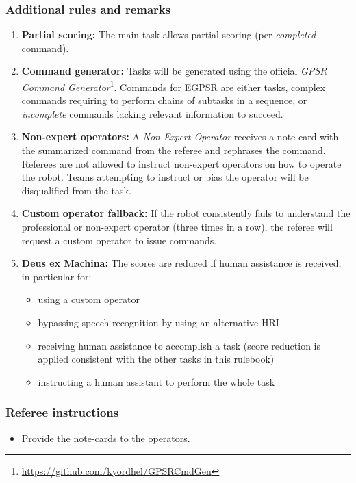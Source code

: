 \subsubsection*{Additional rules and remarks}
\begin{enumerate}[nosep]
	\item \textbf{Partial scoring:} The main task allows partial scoring (per \emph{completed} command).

	\item \textbf{Command generator:} Tasks will be generated using the official \emph{GPSR Command Generator}\footnote{\url{https://github.com/kyordhel/GPSRCmdGen}}.
	Commands for EGPSR are either \STWO{} tasks, complex commands requiring to perform chains of subtasks in a sequence, or \emph{incomplete} commands lacking relevant information to succeed.

	\item \textbf{Non-expert operators:} A \emph{Non-Expert Operator} receives a note-card with the summarized command from the referee and rephrases the command.
	Referees are not allowed to instruct non-expert operators on how to operate the robot.
	Teams attempting to instruct or bias the operator will be disqualified from the task.

	\item \textbf{Custom operator fallback:} If the robot consistently fails to understand the professional or non-expert operator (three times in a row), the referee will request a custom operator to issue commands.

	\item \textbf{Deus ex Machina:} The scores are reduced if human assistance is received, in particular for:
	\begin{itemize}
		\item using a custom operator
		\item bypassing speech recognition by using an alternative HRI
		\item receiving human assistance to accomplish a task (score reduction is applied consistent with the other tasks in this rulebook)
		\item instructing a human assistant to perform the whole task
	\end{itemize}
\end{enumerate}

\subsubsection*{Referee instructions}
\begin{itemize}
	\item Provide the note-cards to the operators.
\end{itemize}

